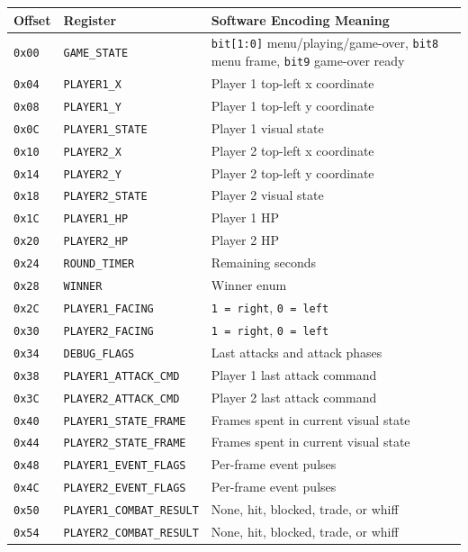 \documentclass[12pt,a4paper]{article}
\begin{document}
\begin{longtable}{>{\raggedright\arraybackslash}p{} >{\raggedright\arraybackslash}p{} >{\raggedright\arraybackslash}p{}}
\toprule
Offset & Register & Software Encoding Meaning \\
\midrule
\endhead
\texttt{0x00} & \texttt{GAME\_STATE} & \texttt{bit[1:0]} menu/playing/game-over, \texttt{bit8} menu frame, \texttt{bit9} game-over ready \\
\texttt{0x04} & \texttt{PLAYER1\_X} & Player 1 top-left x coordinate \\
\texttt{0x08} & \texttt{PLAYER1\_Y} & Player 1 top-left y coordinate \\
\texttt{0x0C} & \texttt{PLAYER1\_STATE} & Player 1 visual state \\
\texttt{0x10} & \texttt{PLAYER2\_X} & Player 2 top-left x coordinate \\
\texttt{0x14} & \texttt{PLAYER2\_Y} & Player 2 top-left y coordinate \\
\texttt{0x18} & \texttt{PLAYER2\_STATE} & Player 2 visual state \\
\texttt{0x1C} & \texttt{PLAYER1\_HP} & Player 1 HP \\
\texttt{0x20} & \texttt{PLAYER2\_HP} & Player 2 HP \\
\texttt{0x24} & \texttt{ROUND\_TIMER} & Remaining seconds \\
\texttt{0x28} & \texttt{WINNER} & Winner enum \\
\texttt{0x2C} & \texttt{PLAYER1\_FACING} & \texttt{1 = right}, \texttt{0 = left} \\
\texttt{0x30} & \texttt{PLAYER2\_FACING} & \texttt{1 = right}, \texttt{0 = left} \\
\texttt{0x34} & \texttt{DEBUG\_FLAGS} & Last attacks and attack phases \\
\texttt{0x38} & \texttt{PLAYER1\_ATTACK\_CMD} & Player 1 last attack command \\
\texttt{0x3C} & \texttt{PLAYER2\_ATTACK\_CMD} & Player 2 last attack command \\
\texttt{0x40} & \texttt{PLAYER1\_STATE\_FRAME} & Frames spent in current visual state \\
\texttt{0x44} & \texttt{PLAYER2\_STATE\_FRAME} & Frames spent in current visual state \\
\texttt{0x48} & \texttt{PLAYER1\_EVENT\_FLAGS} & Per-frame event pulses \\
\texttt{0x4C} & \texttt{PLAYER2\_EVENT\_FLAGS} & Per-frame event pulses \\
\texttt{0x50} & \texttt{PLAYER1\_COMBAT\_RESULT} & None, hit, blocked, trade, or whiff \\
\texttt{0x54} & \texttt{PLAYER2\_COMBAT\_RESULT} & None, hit, blocked, trade, or whiff \\
\bottomrule
\end{longtable}
\end{document}
